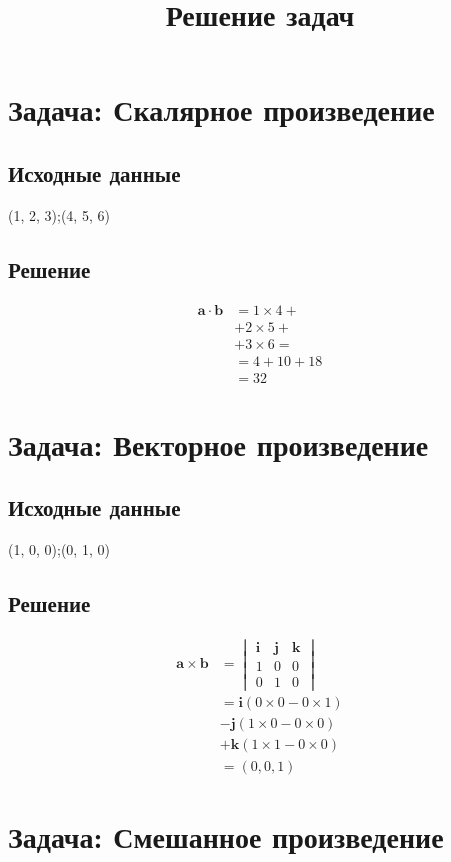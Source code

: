 \documentclass{article}
\begin{document}
\title{Решение задач}
\maketitle
\section{Задача: Скалярное произведение}
\subsection{Исходные данные}
(1, 2, 3);(4, 5, 6)
\subsection{Решение}
\begin{align*}
\mathbf{a} \cdot \mathbf{b} &= 
1 \times 4 + \\ &+ 
2 \times 5 + \\ &+ 
3 \times 6 = \\
&= 4 + 10 + 18 \\
&= 32
\end{align*}
\section{Задача: Векторное произведение}
\subsection{Исходные данные}
(1, 0, 0);(0, 1, 0)
\subsection{Решение}
\begin{align*}
\mathbf{a} \times \mathbf{b} &= \begin{vmatrix} \mathbf{i} & \mathbf{j} & \mathbf{k} \\ 1 & 0 & 0 \\ 0 & 1 & 0 \end{vmatrix} \\
&= \mathbf{i}(0 \times 0 - 0 \times 1) \\
&- \mathbf{j}(1 \times 0 - 0 \times 0) \\
&+ \mathbf{k}(1 \times 1 - 0 \times 0) \\
&= (0, 0, 1)
\end{align*}
\section{Задача: Смешанное произведение}
\end{document}

